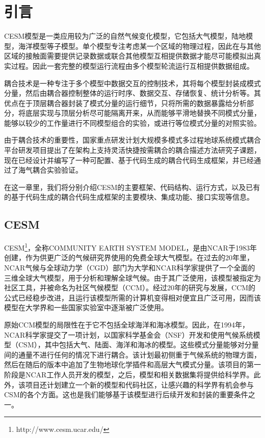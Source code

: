 \chapter{引言}
\label{cha:intro}

CESM模型是一类应用较为广泛的自然气候变化模型，它包括大气模型，陆地模型，海洋模型等子模型。单个模型专注考虑某一个区域的物理过程，因此在与其他区域的接触面需要提供记录数据或联合其他模型互相提供数据才能尽可能模拟出真实过程。因此一套完整的模型运行流程由多个模型轮流运行互相提供数据组成。

耦合技术是一种专注于多个模型中数据交互的控制技术，其将每个模型封装成模式分量，然后由耦合器控制整体的运行时序、数据交互、存储恢复、统计分析等。其优点在于顶层耦合器封装了模式分量的运行细节，只将所需的数据暴露给分析部分，将底层实现与顶层分析尽可能隔离开来，从而能够平滑地替换不同模式分量，能够以较少的工作量进行不同模型组合的实验，或进行等位模式分量的对照实验。

由于耦合技术的重要性，国家重点研发计划大规模多模式多过程地球系统模式耦合平台研发项目提出了在架构上支持灵活快捷按需耦合的耦合描述方法研究子课题，现在已经设计并编写了一种可配置、基于代码生成的耦合代码生成框架，并已经通过了海气耦合实验验证。

在这一章里，我们将分别介绍CESM的主要框架、代码结构、运行方式，以及已有的基于代码生成的耦合代码生成框架的主要模块、集成功能、接口实现等信息。

\section{CESM}

CESM\texttrademark\footnote{http://www.cesm.ucar.edu/}，全称COMMUNITY EARTH SYSTEM MODEL，是由NCAR于1983年创建，作为供更广泛的气候研究界使用的免费全球大气模型。在过去的20年里，NCAR气候与全球动力学（CGD）部门为大学和NCAR科学家提供了一个全面的三维全球大气模型，用于分析和理解全球气候。由于其广泛使用，该模型被指定为社区工具，并被命名为社区气候模型（CCM）。经过20年的研究与发展，CCM的公式已经稳步改进，且运行该模型所需的计算机变得相对便宜且广泛可用，因而该模型在大学界和一些国家实验室中逐渐被广泛使用。

原始CCM模型的局限性在于它不包括全球海洋和海冰模型。因此，在1994年，NCAR科学家提交了一项计划，以国家科学基金会（NSF）开发和使用气候系统模型（CSM），其中包括大气、陆面、海洋和海冰的模型。这些模式分量能够对分量间的通量不进行任何的情况下进行耦合。该计划最初侧重于气候系统的物理方面，然后在随后的版本中追加了生物地球化学插件和高层大气模式分量。该项目的第一阶段是NCAR工作人员开发的模型，之后，模型和相关数据集将提供给科学界。此外，该项目还计划建立一个新的模型和代码社区，让感兴趣的科学界有机会参与CSM的各个方面。这也是我们能够基于该模型进行后续开发和封装的重要条件之一。

